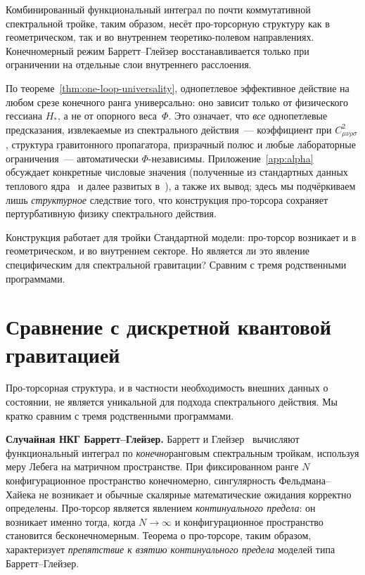 \documentclass[12pt,a4paper]{article}
\theoremstyle{plain}
\theoremstyle{definition}
\theoremstyle{remark}
\begin{document}
Комбинированный функциональный интеграл по почти коммутативной
спектральной тройке, таким образом, несёт про-торсорную структуру как
в геометрическом, так и во внутреннем теоретико-полевом направлениях.
Конечномерный режим Барретт--Глейзер восстанавливается только при
ограничении на отдельные слои внутреннего расслоения.

По теореме~\ref{thm:one-loop-universality}, однопетлевое эффективное
действие на любом срезе конечного ранга универсально: оно зависит
только от физического гессиана $H_*$, а не от опорного
веса~$\Phi$.  Это означает, что \emph{все} однопетлевые предсказания,
извлекаемые из спектрального действия~--- коэффициент при $C_{\mu\nu\rho\sigma}^2$,
структура гравитонного пропагатора, призрачный полюс и любые
лабораторные ограничения~--- автоматически $\Phi$-независимы.
Приложение~\ref{app:alpha} обсуждает конкретные числовые значения
(полученные из стандартных данных теплового
ядра~\cite{Vassilevich:2003,CPR:2009,CZ:2013} и далее
развитых в~\cite{Alfyorov:2026ff,Alfyorov:2026ss}), а также их
вывод; здесь мы подчёркиваем лишь \emph{структурное} следствие
того, что конструкция про-торсора сохраняет пертурбативную физику
спектрального действия.

Конструкция работает для тройки Стандартной модели: про-торсор возникает и в геометрическом, и во внутреннем секторе. Но является ли это явление специфическим для спектральной гравитации? Сравним с тремя родственными программами.

\section{Сравнение с дискретной квантовой гравитацией}
\label{sec:comparison}

Про-торсорная структура, и в частности необходимость внешних
данных о состоянии, не является уникальной для подхода спектрального
действия.  Мы кратко сравним с тремя родственными программами.

\medskip

\noindent\textbf{Случайная НКГ Барретт--Глейзер.}\quad
Барретт и Глейзер~\cite{BarrettGlaser:2016} вычисляют функциональный
интеграл по \emph{конечно}ранговым спектральным тройкам, используя меру
Лебега на матричном пространстве.  При фиксированном ранге $N$
конфигурационное пространство конечномерно, сингулярность
Фельдмана--Хайека не возникает и обычные скалярные математические
ожидания корректно определены.  Про-торсор является явлением
\emph{континуального предела}: он возникает именно тогда, когда
$N \to \infty$ и конфигурационное пространство становится бесконечномерным.
Теорема о про-торсоре, таким образом, характеризует \emph{препятствие
к взятию континуального предела} моделей типа Барретт--Глейзер.
\end{document}
